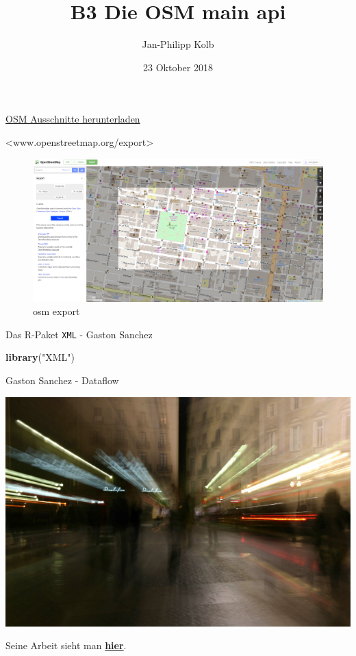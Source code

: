 \documentclass[ignorenonframetext,]{beamer}
\title{B3 Die OSM main api}
\author{Jan-Philipp Kolb}
\date{23 Oktober 2018}
\newenvironment{Shaded}{\begin{snugshade}}{\end{snugshade}}
\newcommand{\KeywordTok}[1]{\textcolor[rgb]{0.26,0.66,0.93}{\textbf{#1}}}
\newcommand{\NormalTok}[1]{\textcolor[rgb]{0.74,0.68,0.62}{#1}}
\newcommand{\StringTok}[1]{\textcolor[rgb]{0.02,0.61,0.04}{#1}}
\begin{document}
\frame{\titlepage}

\begin{frame}{\href{http://www.openstreetmap.org/export}{OSM Ausschnitte
herunterladen}}
\protect\hypertarget{osm-ausschnitte-herunterladen}{}

\textless{}www.openstreetmap.org/export\textgreater{}

\begin{figure}
\centering
\includegraphics{figure/openstreetmap_export-1024x505.png}
\caption{osm export}
\end{figure}

\end{frame}

\begin{frame}[fragile]{Das R-Paket \texttt{XML} - Gaston Sanchez}
\protect\hypertarget{das-r-paket-xml---gaston-sanchez}{}

\begin{Shaded}
\begin{Highlighting}[]
\KeywordTok{library}\NormalTok{(}\StringTok{"XML"}\NormalTok{)}
\end{Highlighting}
\end{Shaded}

\begin{block}{Gaston Sanchez - Dataflow}

\includegraphics{figure/GastonSanchez2.png}

Seine Arbeit sieht man \href{http://gastonsanchez.com/}{\textbf{hier}}.

\end{block}

\end{frame}
\end{document}
